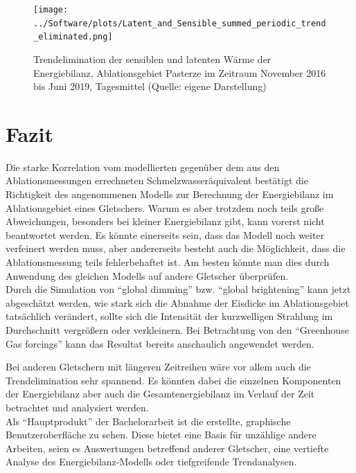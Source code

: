 \documentclass[11pt,a4paper]{article}
\begin{document}
\begin{figure}[H]
\centering
\texttt{[image: ../Software/plots/Latent\_and\_Sensible\_summed\_periodic\_trend\_eliminated.png]}
\caption[Trendelimination der sensiblen und latenten Wärme der Energiebilanz, Ablationsgebiet Pasterze im Zeitraum November 2016 bis Juni 2019, Tagesmittel]{Trendelimination der sensiblen und latenten Wärme der Energiebilanz, Ablationsgebiet Pasterze im Zeitraum November 2016 bis Juni 2019, Tagesmittel (Quelle: eigene Darstellung)}
\label{fig:Trendelimination der sensiblen und latenten Wärme der Energiebilanz}
\end{figure}


\pagebreak
\section{Fazit}
Die starke Korrelation vom modellierten gegenüber dem aus den Ablationsmessungen errechneten Schmelzwasseräquivalent bestätigt die Richtigkeit des angenommenen Modells zur Berechnung der Energiebilanz im Ablationsgebiet eines Gletschers. Warum es aber trotzdem noch teils große Abweichungen, besonders bei kleiner Energiebilanz gibt, kann vorerst nicht beantwortet werden. Es könnte einerseits sein, dass das Modell noch weiter verfeinert werden muss, aber andererseits besteht auch die Möglichkeit, dass die Ablationsmessung teils fehlerbehaftet ist. Am besten könnte man dies durch Anwendung des gleichen Modells auf andere Gletscher überprüfen.\\

Durch die Simulation von ``global dimming'' bzw. ``global brightening'' kann jetzt abgeschätzt werden, wie stark sich die Abnahme der Eisdicke im Ablationsgebiet tatsächlich verändert, sollte sich die Intensität der kurzwelligen Strahlung im Durchschnitt vergrößern oder verkleinern. Bei Betrachtung von den ``Greenhouse Gas forcings'' kann das Resultat bereits anschaulich angewendet werden.

Bei anderen Gletschern mit längeren Zeitreihen wäre vor allem auch die Trendelimination sehr spannend. Es könnten dabei die einzelnen Komponenten der Energiebilanz aber auch die Gesamtenergiebilanz im Verlauf der Zeit betrachtet und analysiert werden.\\

Als ``Hauptprodukt'' der Bachelorarbeit ist die erstellte, graphische Benutzeroberfläche zu sehen. Diese bietet eine Basis für unzählige andere Arbeiten, seien es Auswertungen betreffend anderer Gletscher, eine vertiefte Analyse des Energiebilanz-Modells oder tiefgreifende Trendanalysen.  
\end{document}
